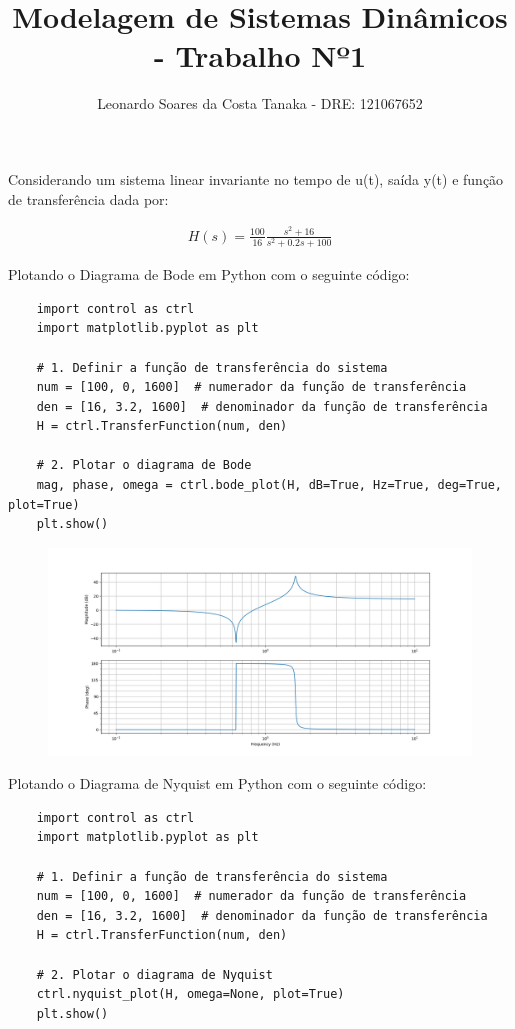 \documentclass[10pt]{article}
\title{Modelagem de Sistemas Dinâmicos - Trabalho Nº1}
\author{
    Leonardo Soares da Costa Tanaka - DRE: 121067652
}
\date{}
\begin{document}
\maketitle
\thispagestyle{capa}
\newpage

Considerando um sistema linear invariante no tempo de u(t), saída y(t) e 
função de transferência dada por:

\begin{align*}
    H(s) = \frac{100}{16} \frac{s^2 + 16}{s^2 + 0.2s + 100}
\end{align*}

Plotando o Diagrama de Bode em Python com o seguinte código:

\begin{verbatim}
    import control as ctrl
    import matplotlib.pyplot as plt

    # 1. Definir a função de transferência do sistema
    num = [100, 0, 1600]  # numerador da função de transferência
    den = [16, 3.2, 1600]  # denominador da função de transferência
    H = ctrl.TransferFunction(num, den)

    # 2. Plotar o diagrama de Bode
    mag, phase, omega = ctrl.bode_plot(H, dB=True, Hz=True, deg=True, plot=True)
    plt.show()
\end{verbatim}

\begin{figure}[h]
    \includegraphics[scale=0.45]{bode.png}
    \centering
\end{figure}

Plotando o Diagrama de Nyquist em Python com o seguinte código:

\begin{verbatim}
    import control as ctrl
    import matplotlib.pyplot as plt

    # 1. Definir a função de transferência do sistema
    num = [100, 0, 1600]  # numerador da função de transferência
    den = [16, 3.2, 1600]  # denominador da função de transferência
    H = ctrl.TransferFunction(num, den)

    # 2. Plotar o diagrama de Nyquist
    ctrl.nyquist_plot(H, omega=None, plot=True)
    plt.show()
\end{verbatim}
\end{document}
